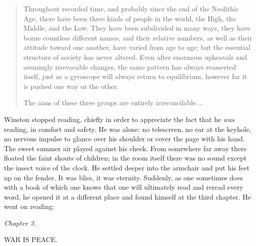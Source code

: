 \begin{quotation}
Throughout recorded time, and probably since the end of the Neolithic
Age, there have been three kinds of people in the world, the High, the
Middle, and the Low. They have been subdivided in many ways, they have
borne countless different names, and their relative numbers, as well as
their attitude toward one another, have varied from age to age; but the
essential structure of society has never altered. Even after enormous
upheavals and seemingly irrevocable changes, the same pattern has always
reasserted itself, just as a gyroscope will always return to
equilibrium, however far it is pushed one way or the other.

The aims of these three groups are entirely irreconcilable....
\end{quotation}

Winston stopped reading, chiefly in order to appreciate the fact that he
\emph{was} reading, in comfort and safety. He was alone: no telescreen,
no ear at the keyhole, no nervous impulse to glance over his shoulder or
cover the page with his hand. The sweet summer air played against his
cheek. From somewhere far away there floated the faint shouts of
children; in the room itself there was no sound except the insect voice
of the clock. He settled deeper into the armchair and put his feet up on
the fender. It was bliss, it was eternity. Suddenly, as one sometimes
does with a book of which one knows that one will ultimately read and
reread every word, he opened it at a different place and found himself
at the third chapter. He went on reading:

\begin{center}
\emph{Chapter 3.}

WAR IS PEACE.
\end{center}

